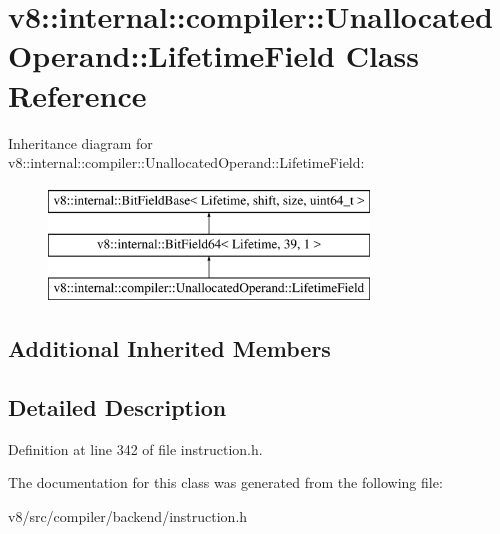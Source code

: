 \hypertarget{classv8_1_1internal_1_1compiler_1_1UnallocatedOperand_1_1LifetimeField}{}\section{v8\+:\+:internal\+:\+:compiler\+:\+:Unallocated\+Operand\+:\+:Lifetime\+Field Class Reference}
\label{classv8_1_1internal_1_1compiler_1_1UnallocatedOperand_1_1LifetimeField}
Inheritance diagram for v8\+:\+:internal\+:\+:compiler\+:\+:Unallocated\+Operand\+:\+:Lifetime\+Field\+:\begin{figure}[H]
\begin{center}
\leavevmode
\includegraphics[height=3.000000cm]{classv8_1_1internal_1_1compiler_1_1UnallocatedOperand_1_1LifetimeField}
\end{center}
\end{figure}
\subsection*{Additional Inherited Members}


\subsection{Detailed Description}


Definition at line 342 of file instruction.\+h.



The documentation for this class was generated from the following file\+:\begin{DoxyCompactItemize}
\item 
v8/src/compiler/backend/instruction.\+h\end{DoxyCompactItemize}
